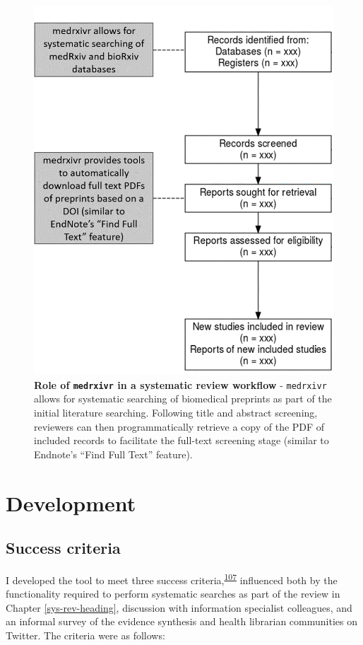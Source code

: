 \documentclass[a4paper, twoside]{templates/ociamthesis}
\begin{document}
~





\begin{figure}

{\centering \includegraphics[width=0.65\linewidth]{figures/sys-rev-tools/medrxiv-role} 

}

\caption[Role of \texttt{medrxivr} in a systematic review workflow]{\textbf{Role of \texttt{medrxivr} in a systematic review workflow} - \texttt{medrxivr} allows for systematic searching of biomedical preprints as part of the initial literature searching. Following title and abstract screening, reviewers can then programmatically retrieve a copy of the PDF of included records to facilitate the full-text screening stage (similar to Endnote's ``Find Full Text'' feature).}\label{fig:medrxivr-sr}
\end{figure}

\hypertarget{development}{%
\section{Development}\label{development}}

\hypertarget{success-criteria}{%
\subsection{Success criteria}\label{success-criteria}}

I developed the tool to meet three success criteria,\textsuperscript{\protect\hyperlink{ref-wateridge1995}{107}} influenced both by the functionality required to perform systematic searches as part of the review in Chapter \ref{sys-rev-heading}, discussion with information specialist colleagues, and an informal survey of the evidence synthesis and health librarian communities on Twitter. The criteria were as follows:
\end{document}
